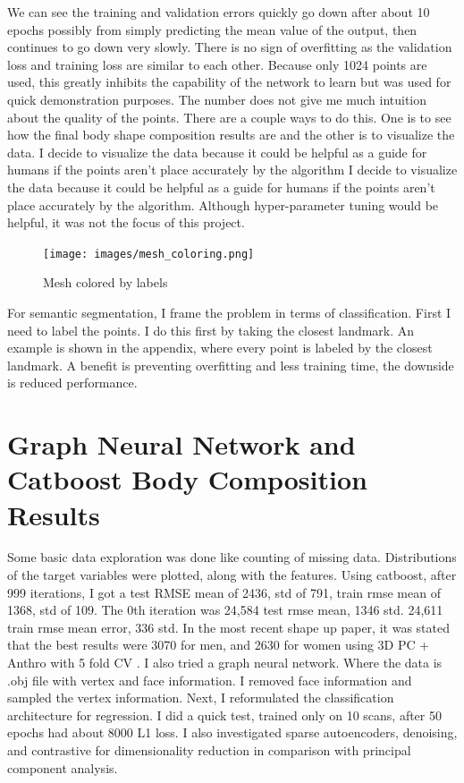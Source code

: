 We can see the training and validation errors quickly go down after about 10 epochs possibly from simply predicting the mean value of the output, then continues to go down very slowly. There is no sign of overfitting as the validation loss and training loss are similar to each other. Because only 1024 points are used, this greatly inhibits the capability of the network to learn but was used for quick demonstration purposes. The number does not give me much intuition about the quality of the points. There are a couple ways to do this. One is to see how the final body shape composition results are and the other is to visualize the data. I decide to visualize the data because it could be helpful as a guide for humans if the points aren't place accurately by the algorithm  I decide to visualize the data because it could be helpful as a guide for humans if the points aren't place accurately by the algorithm. Although hyper-parameter tuning would be helpful, it was not the focus of this project. 

\begin{figure}[!htb]
	\caption{Mesh colored by labels}
	\centering
	\texttt{[image: images/mesh\_coloring.png]}
\end{figure}

For semantic segmentation, I frame the problem in terms of classification. First I need to label the points. I do this first by taking the closest landmark. An example is shown in the appendix, where every point is labeled by the closest landmark. A benefit is preventing overfitting and less training time, the downside is reduced performance.

\section{Graph Neural Network and Catboost Body Composition Results}

Some basic data exploration was done like counting of missing data. Distributions of the target variables were plotted, along with the features. Using catboost, after 999 iterations, I got a test RMSE mean of 2436, std of 791, train rmse mean of 1368, std of 109. The 0th iteration was 24,584 test rmse mean, 1346 std. 24,611 train rmse mean error, 336 std. In the most recent shape up paper, it was stated that the best results were 3070 for men, and 2630 for women using 3D PC + Anthro with 5 fold CV \cite{article}. I also tried a graph neural network. Where the data is .obj file with vertex and face information. I removed face information and sampled the vertex information. Next, I reformulated the classification architecture for regression. I did a quick test, trained only on 10 scans, after 50 epochs had about 8000 L1 loss. I also investigated sparse autoencoders, denoising, and contrastive for dimensionality reduction in comparison with principal component analysis.


